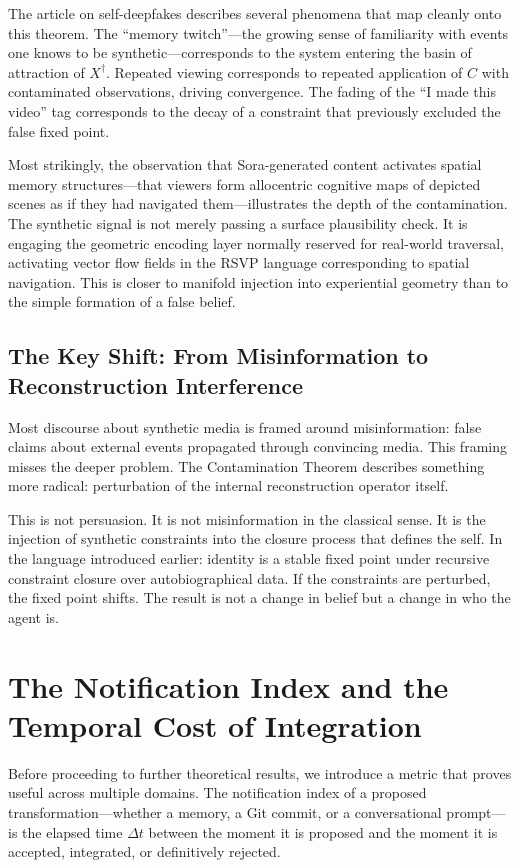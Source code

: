 \documentclass[12pt, letterpaper]{article}
\theoremstyle{flyxion}
\begin{document}
The article on self-deepfakes describes several phenomena that map cleanly onto this theorem. The ``memory twitch''---the growing sense of familiarity with events one knows to be synthetic---corresponds to the system entering the basin of attraction of $X^\dagger$. Repeated viewing corresponds to repeated application of $C$ with contaminated observations, driving convergence. The fading of the ``I made this video'' tag corresponds to the decay of a constraint that previously excluded the false fixed point.

Most strikingly, the observation that Sora-generated content activates spatial memory structures---that viewers form allocentric cognitive maps of depicted scenes as if they had navigated them---illustrates the depth of the contamination. The synthetic signal is not merely passing a surface plausibility check. It is engaging the geometric encoding layer normally reserved for real-world traversal, activating vector flow fields in the RSVP language corresponding to spatial navigation. This is closer to manifold injection into experiential geometry than to the simple formation of a false belief.

\subsection{The Key Shift: From Misinformation to Reconstruction Interference}

Most discourse about synthetic media is framed around misinformation: false claims about external events propagated through convincing media. This framing misses the deeper problem. The Contamination Theorem describes something more radical: perturbation of the internal reconstruction operator itself.

This is not persuasion. It is not misinformation in the classical sense. It is the injection of synthetic constraints into the closure process that defines the self. In the language introduced earlier: identity is a stable fixed point under recursive constraint closure over autobiographical data. If the constraints are perturbed, the fixed point shifts. The result is not a change in belief but a change in who the agent is.

\section{The Notification Index and the Temporal Cost of Integration}

Before proceeding to further theoretical results, we introduce a metric that proves useful across multiple domains. The notification index of a proposed transformation---whether a memory, a Git commit, or a conversational prompt---is the elapsed time $\Delta t$ between the moment it is proposed and the moment it is accepted, integrated, or definitively rejected.
\end{document}
